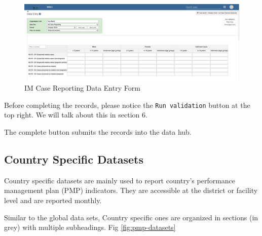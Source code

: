 \documentclass[]{book}
\begin{document}
\begin{figure}
\includegraphics[width=46.42in]{./images/data-entry} \caption{IM Case Reporting Data Entry Form}\label{fig:data-entry}
\end{figure}

Before completing the records, please notice the \texttt{Run\ validation} button at the top right. We will talk about this in section 6.

The complete button submits the records into the data hub.

\hypertarget{country-dataset}{%
\subsection{Country Specific Datasets}\label{country-dataset}}

Country specific datasets are mainly used to report country's performance management plan (PMP) indicators. They are accessible at the district or facility level and are reported monthly.

Similar to the global data sets, Country specific ones are organized in sections (in grey) with multiple subheadings. Fig \ref{fig:pmp-datasets}
\end{document}
